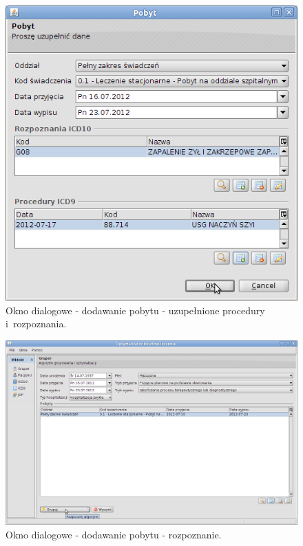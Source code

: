 \begin{figure}%
\centering
\includegraphics[scale=0.4]{images/gruper7}
\caption[Widok grupera]{Okno dialogowe - dodawanie pobytu - uzupełnione procedury i~rozpoznania.}
\label{img:gruper7}
\end{figure}

\begin{figure}%
\centering
\includegraphics[scale=0.4]{images/gruper8}
\caption[Widok grupera]{Okno dialogowe - dodawanie pobytu - rozpoznanie.}
\label{img:gruper8}
\end{figure}

